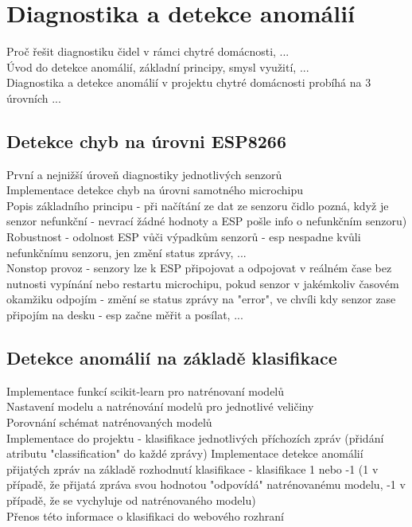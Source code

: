 \chapter{Diagnostika a detekce anomálií} \label{chap:methods}

Proč řešit diagnostiku čidel v rámci chytré domácnosti, ... \\
Úvod do detekce anomálií, základní principy, smysl využití, ... \\
Diagnostika a detekce anomálií v projektu chytré domácnosti probíhá na 3 úrovních ... \\

\section{Detekce chyb na úrovni ESP8266} \label{sec:example_xor}

První a nejnižší úroveň diagnostiky jednotlivých senzorů \\
Implementace detekce chyb na úrovni samotného microchipu \\
Popis základního principu - při načítání ze dat ze senzoru čidlo pozná, když je senzor nefunkční - nevrací  žádné hodnoty a ESP pošle info o nefunkčním senzoru) \\
Robustnost - odolnost ESP vůči výpadkům senzorů - esp nespadne kvůli nefunkčnímu senzoru, jen změní status zprávy, ... \\
Nonstop provoz - senzory lze k ESP připojovat a odpojovat v reálném čase bez nutnosti vypínání nebo restartu microchipu, pokud senzor v jakémkoliv časovém okamžiku odpojím - změní se status zprávy na "error", ve chvíli kdy senzor zase připojím na desku - esp začne měřit a posílat, ... \\

\section{Detekce anomálií na základě klasifikace} \label{sec:example_xor}

Implementace funkcí scikit-learn pro natrénovaní modelů \\
Nastavení modelu a natrénování modelů pro jednotlivé veličiny \\
Porovnání schémat natrénovaných modelů \\
Implementace do projektu - klasifikace jednotlivých příchozích zpráv (přidání atributu "classification" do každé zprávy)
Implementace detekce anomálií přijatých zpráv na základě rozhodnutí klasifikace - klasifikace 1 nebo -1 (1 v případě, že přijatá zpráva svou hodnotou "odpovídá" natrénovanému modelu, -1 v případě, že se vychyluje od natrénovaného modelu) \\
Přenos této informace o klasifikaci do webového rozhraní \\

